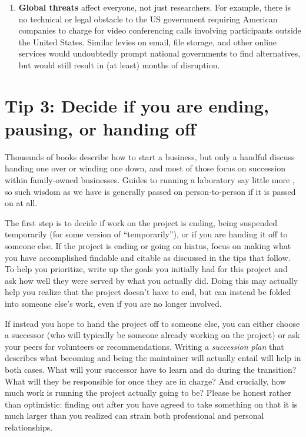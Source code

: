 \documentclass[10pt,letterpaper]{article}
\begin{document}
\begin{enumerate}
\item
  \textbf{Global threats} affect everyone,
  not just researchers.
  For example,
  there is no technical or legal obstacle to the US government
  requiring American companies to charge for video conferencing calls
  involving participants outside the United States.
  Similar levies on email,
  file storage,
  and other online services would undoubtedly prompt national governments to find alternatives,
  but would still result in (at least) months of disruption.

\end{enumerate}

\section*{Tip 3: Decide if you are ending, pausing, or handing off}

Thousands of books describe how to start a business,
but only a handful discuss handing one over or winding one down,
and most of those focus on succession within family-owned businesses.
Guides to running a laboratory say little more \cite{Barker2010,Cohen2018},
so such wisdom as we have is generally passed on person-to-person if it is passed on at all.

The first step is to decide if work on the project is ending,
being suspended temporarily (for some version of ``temporarily''),
or if you are handing it off to someone else.
If the project is ending or going on hiatus,
focus on making what you have accomplished findable and citable
as discussed in the tips that follow.
To help you prioritize,
write up the goals you initially had for this project
and ask how well they were served by what you actually did.
Doing this may actually help you realize that the project doesn't have to end,
but can instead be folded into someone else's work,
even if you are no longer involved.

If instead you hope to hand the project off to someone else,
you can either choose a successor
(who will typically be someone already working on the project)
or ask your peers for volunteers or recommendations.
Writing a \emph{succession plan} that describes what becoming and being the maintainer will actually entail
will help in both cases.
What will your successor have to learn and do during the transition?
What will they be responsible for once they are in charge?
And crucially,
how much work is running the project actually going to be?
Please be honest rather than optimistic:
finding out after you have agreed to take something on
that it is much larger than you realized
can strain both professional and personal relationships.
\end{document}

